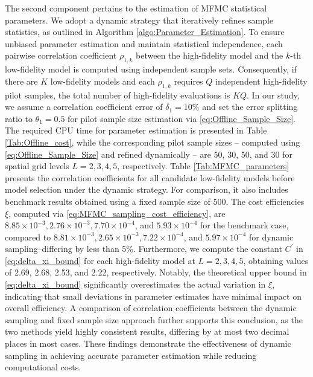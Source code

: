 The second component pertains to the estimation of MFMC statistical parameters. We adopt a dynamic strategy that iteratively refines sample statistics, as outlined in Algorithm \ref{algo:Parameter_Estimation}. To ensure unbiased parameter estimation and maintain statistical independence, each pairwise correlation coefficient $\rho_{1,k}$ between the high-fidelity model and the $k$-th low-fidelity model is computed using independent sample sets. Consequently, if there are $K$ low-fidelity models and each $\rho_{1,k}$ requires $Q$ independent high-fidelity pilot samples, the total number of high-fidelity evaluations is $KQ$. In our study, we assume a correlation coefficient error of $\delta_1 = 10\%$ and set the error splitting ratio to $\theta_1=0.5$ for pilot sample size estimation via \eqref{eq:Offline_Sample_Size}. The required CPU time for parameter estimation is presented in Table \ref{Tab:Offline_cost}, while the corresponding pilot sample sizes -- computed using \eqref{eq:Offline_Sample_Size} and refined dynamically -- are 50, 30, 50, and 30 for spatial grid levels $L=2,3,4,5$, respectively. Table \ref{Tab:MFMC_parameters} presents the correlation coefficients for all candidate low-fidelity models before model selection under the dynamic strategy. For comparison, it also includes benchmark results obtained using a fixed sample size of 500. The cost efficiencies $\xi$, computed via \eqref{eq:MFMC_sampling_cost_efficiency}, are $8.85\times 10^{-3}, 2.76\times 10^{-3}, 7.70\times 10^{-4}$, and $5.93\times 10^{-4}$ for the benchmark case, compared to $8.81\times 10^{-3}, 2.65\times 10^{-3}, 7.22\times 10^{-4}$, and $ 5.97\times 10^{-4}$ for dynamic sampling--differing by less than 5\%. Furthermore, we compute the constant $C^\prime$ in \eqref{eq:delta_xi_bound} for each high-fidelity model at $L=2,3,4,5$, obtaining values of 2.69, 2.68, 2.53, and 2.22, respectively. Notably, the theoretical upper bound in \eqref{eq:delta_xi_bound} significantly overestimates the actual variation in $\xi$, indicating that small deviations in parameter estimates have minimal impact on overall efficiency. A comparison of correlation coefficients between the dynamic sampling and fixed sample size approach further supports this conclusion, as the two methods yield highly consistent results, differing by at most two decimal places in most cases. These findings demonstrate the effectiveness of dynamic sampling in achieving accurate parameter estimation while reducing computational costs.







